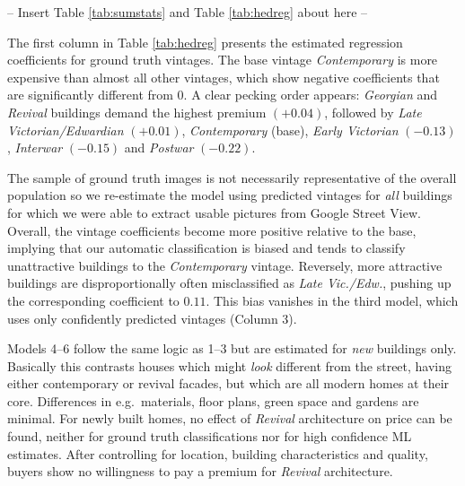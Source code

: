 \documentclass[]{article}
\begin{document}
\begin{center}
  -- Insert Table \ref{tab:sumstats} and Table \ref{tab:hedreg} about here --
\end{center}

The first column in Table \ref{tab:hedreg} presents the estimated
regression coefficients for ground truth vintages. The base vintage
\emph{Contemporary} is more expensive than almost all other vintages,
which show negative coefficients that are significantly different from
0. A clear pecking order appears: \emph{Georgian} and \emph{Revival}
buildings demand the highest premium \((+0.04)\), followed by \emph{Late
Victorian/Edwardian} \((+0.01)\), \emph{Contemporary} (base),
\emph{Early Victorian} \((-0.13)\), \emph{Interwar} \((-0.15)\) and
\emph{Postwar} \((-0.22)\).

The sample of ground truth images is not necessarily representative of
the overall population so we re-estimate the model using predicted
vintages for \emph{all} buildings for which we were able to extract
usable pictures from Google Street View. Overall, the vintage
coefficients become more positive relative to the base, implying that
our automatic classification is biased and tends to classify
unattractive buildings to the \emph{Contemporary} vintage. Reversely,
more attractive buildings are disproportionally often misclassified as
\emph{Late Vic./Edw.}, pushing up the corresponding coefficient to
\(0.11\). This bias vanishes in the third model, which uses only
confidently predicted vintages (Column 3).

Models 4--6 follow the same logic as 1--3 but are estimated for
\emph{new} buildings only. Basically this contrasts houses which might
\emph{look} different from the street, having either contemporary or
revival facades, but which are all modern homes at their core.
Differences in e.g.~materials, floor plans, green space and gardens are
minimal. For newly built homes, no effect of \emph{Revival} architecture
on price can be found, neither for ground truth classifications nor for
high confidence ML estimates. After controlling for location, building
characteristics and quality, buyers show no willingness to pay a premium
for \emph{Revival} architecture.
\end{document}
